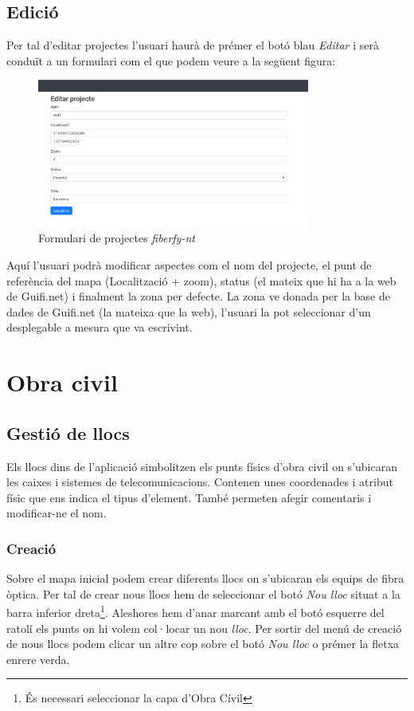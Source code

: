 \documentclass[a4paper]{article}
\begin{document}
	\subsection{Edició}
	Per tal d'editar projectes l'usuari haurà de prémer el botó blau \emph{Editar} i serà conduït a un formulari com el que podem veure a la següent figura:
	
	\begin{figure}[H]
		\centering
		\includegraphics[width=0.8\textwidth]{images/project_edit_form.png}
		\caption{Formulari de projectes \emph{fiberfy-nt}}
	\end{figure}

	Aquí l'usuari podrà modificar aspectes com el nom del projecte, el punt de referència del mapa (Localització + zoom), status (el mateix que hi ha a la web de Guifi.net) i finalment la zona per defecte. La zona ve donada per la base de dades de Guifi.net (la mateixa que la web), l'usuari la pot seleccionar d'un desplegable a mesura que va escrivint.
	
	\newpage
	\section{Obra civil}
	\subsection{Gestió de llocs}
	Els llocs dins de l'aplicació simbolitzen els punts físics d'obra civil on s'ubicaran les caixes i sistemes de telecomunicacions. Contenen unes coordenades i atribut físic que ens indica el tipus d'element. També permeten afegir comentaris i modificar-ne el nom.
	
	\subsubsection{Creació}
	Sobre el mapa inicial podem crear diferents llocs on s'ubicaran els equips de fibra òptica. Per tal de crear nous llocs hem de seleccionar el botó \emph{Nou lloc} situat a la barra inferior dreta\footnote{És necessari seleccionar la capa d'Obra Cívil}. Aleshores hem d'anar marcant amb el botó esquerre del ratolí els punts on hi volem col·locar un nou \emph{lloc}. Per sortir del menú de creació de nous llocs podem clicar un altre cop sobre el botó \emph{Nou \emph{lloc}} o prémer la fletxa enrere verda.
	
\end{document}
